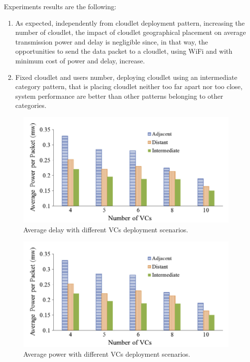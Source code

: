 \documentclass[sigchi]{acmart}
\begin{document}
Experiments results are the following:

\begin{enumerate}

\item As expected, independently from cloudlet deployment pattern, increasing the number of cloudlet, the impact of cloudlet geographical placement on average transmission power and delay is negligible since, in that way, the opportunities to send the data packet to a cloudlet, using WiFi and with minimum cost of power and delay, increase.

\item Fixed cloudlet and users number, deploying cloudlet using an intermediate category pattern, that is placing cloudlet neither too far apart nor too close, system performance are better than other patterns belonging to other categories.

\end{enumerate}

\begin{figure}
  \includegraphics[width=\linewidth]{Set3.1.png}
  \caption{Average delay with different VCs deployment scenarios.}
  \label{fig:model}
\end{figure}

\begin{figure}
  \includegraphics[width=\linewidth]{Set3.1.png}
  \caption{Average power with different VCs deployment scenarios.}
  \label{fig:model}
\end{figure}
\end{document}
